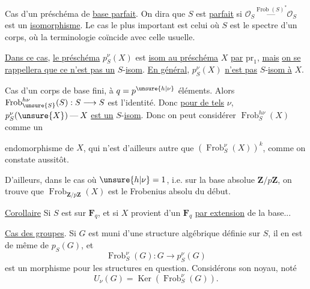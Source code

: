 Cas d'un préschéma de \uline{base parfait}.
On dira que $S$ est \uline{parfait} si 
$\mathcal O_S\mathbin{\overset{\operatorname{Frob}(S)^*}{\text{---}}}\mathcal O_S$
est un \uline{isomorphisme}.
Le cas le plus important est celui où $S$ est le spectre d'un corps, où
la terminologie coïncide avec celle usuelle.

\uline{Dans ce cas}, \uline{le préschéma} $p_S^\nu(X)$ est
\uline{isom au préschéma} $X$ \uline{par} $\mathrm{pr}_1$, \uline{mais}
\uline{on se rappellera que ce n'est pas un} $S$-\uline{isom}.
\uline{En général}, $p_S^\nu(X)$ \uline{n'est pas}
$S$-\uline{isom à} $X$.

Cas d'un corps de base fini, à $q=p^{\unsure{h|\nu}}$ éléments.
\inserted{$[\deleted{\unsure{\nu=h\nu}}\unsure{\nu\mapsto h\nu}]$}
Alors $\operatorname{Frob}_{\unsure{S}}^{h\nu}(S):S\longrightarrow S$
est l'identité. Donc \uline{pour de tels} $\nu$,
$p_S^\nu(\unsure{X})\mathbin{\text{---}}X$ \uline{est un} $S$-\uline{isom}.
Donc on peut considérer $\operatorname{Frob}_S^{h\nu}(X)$ comme un

endomorphisme de $X$, qui n'est d'ailleurs autre que
$(\operatorname{Frob}_S^\nu(X))^k$, comme on constate aussitôt.

D'ailleurs, dans le cas où $\unsure{h|\nu}=1$, i.e.
sur la base absolue $\mathbf Z/p\mathbf Z$, on trouve que
$\operatorname{Frob}_{\mathbf Z/p\mathbf Z}(X)$ est le Frobenius absolu du début.

\uline{Corollaire} Si $S$ est sur $\mathbf F_q$, et si $X$ provient d'un
  $\mathbf F_q$ \uline{par extension} de la base...

\uline{Cas des groupes}. Si $G$ est muni d'une
structure algébrique définie sur $S$, il en est
de même de $p_S(G)$, et 
\[
\operatorname{Frob}_S^\nu(G):G\longrightarrow p_S^\nu(G)
\]
est un morphisme pour les structures en question.
Considérons son noyau, noté
\[
U_\nu(G)=\operatorname{Ker}(\operatorname{Frob}_S^\nu(G)).
\]

